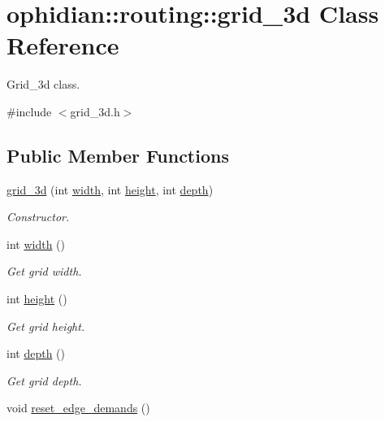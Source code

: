 \hypertarget{classophidian_1_1routing_1_1grid__3d}{\section{ophidian\-:\-:routing\-:\-:grid\-\_\-3d Class Reference}
\label{classophidian_1_1routing_1_1grid__3d}
}


Grid\-\_\-3d class.  




{\ttfamily \#include $<$grid\-\_\-3d.\-h$>$}

\subsection*{Public Member Functions}
\begin{DoxyCompactItemize}
\item 
\hyperlink{classophidian_1_1routing_1_1grid__3d_a00bbc9599e22baacf26d2aba88b5cac9}{grid\-\_\-3d} (int \hyperlink{classophidian_1_1routing_1_1grid__3d_af7f243ab713041d9f17fb50b3f08f67d}{width}, int \hyperlink{classophidian_1_1routing_1_1grid__3d_a5e08cbbf03bccd5b74ccac73ed8cf00a}{height}, int \hyperlink{classophidian_1_1routing_1_1grid__3d_aacf93fbea70553babb928e1ad212ad8c}{depth})
\begin{DoxyCompactList}\small\item\em Constructor. \end{DoxyCompactList}\item 
int \hyperlink{classophidian_1_1routing_1_1grid__3d_af7f243ab713041d9f17fb50b3f08f67d}{width} ()
\begin{DoxyCompactList}\small\item\em Get grid width. \end{DoxyCompactList}\item 
int \hyperlink{classophidian_1_1routing_1_1grid__3d_a5e08cbbf03bccd5b74ccac73ed8cf00a}{height} ()
\begin{DoxyCompactList}\small\item\em Get grid height. \end{DoxyCompactList}\item 
int \hyperlink{classophidian_1_1routing_1_1grid__3d_aacf93fbea70553babb928e1ad212ad8c}{depth} ()
\begin{DoxyCompactList}\small\item\em Get grid depth. \end{DoxyCompactList}\item 
void \hyperlink{classophidian_1_1routing_1_1grid__3d_a6e2d423872ce0adc42ef03927ac5087b}{reset\-\_\-edge\-\_\-demands} ()

\end{DoxyCompactItemize}
